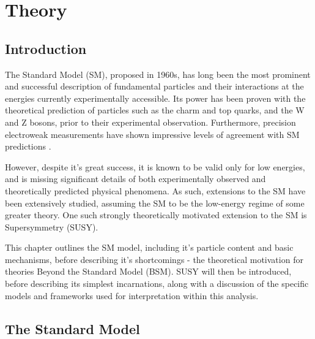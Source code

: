 
\chapter{Theory}
\label{ch:2}

\ifpdf
    \graphicspath{{Chapter2/Figs/Raster/}{Chapter2/Figs/PDF/}{Chapter2/Figs/}}
\else
    \graphicspath{{Chapter2/Figs/Vector/}{Chapter2/Figs/}}
\fi


\section{Introduction}  %
\label{sec:theory_intro}

The Standard Model (SM), proposed in 1960s, has long been the most prominent and
successful description of fundamental particles and their interactions at the
energies currently experimentally accessible. Its power has been proven with the 
theoretical prediction of particles such as the charm and top quarks, and the W
and Z bosons, prior to their experimental observation. Furthermore, precision 
electroweak measurements have shown impressive levels of  agreement with SM
predictions \cite{ALEPH:2010aa}.

However, despite it's great success, it is known to be valid only for low 
energies, and is missing significant details of both experimentally 
observed and theoretically predicted physical phenomena. As such, extensions to
the SM have been extensively studied, assuming the SM to be the low-energy 
regime of some greater theory. One such strongly theoretically motivated
extension to the SM is Supersymmetry (SUSY).

This chapter outlines the SM model, including it's particle content and basic 
mechanisms, before describing it's shortcomings - the theoretical 
motivation for theories Beyond the Standard Model (BSM). SUSY will then be 
introduced, before describing its simplest incarnations, along with a discussion
of the specific models and frameworks used for interpretation within this
analysis.

\section{The Standard Model}
\label{sec:theory_current}


